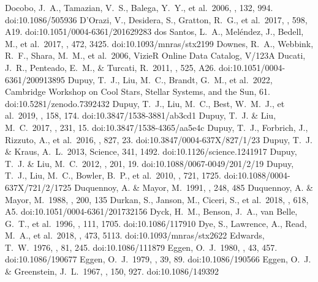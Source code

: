 \documentclass[twocolumn,tighten,twocolappendix]{aastex631}
\begin{document}
\begin{thebibliography}{}
 Docobo, J.~A., Tamazian, V.~S., Balega, Y.~Y., et al.\ 2006, \aj, 132, 994. doi:10.1086/505936
 D'Orazi, V., Desidera, S., Gratton, R.~G., et al.\ 2017, \aap, 598, A19. doi:10.1051/0004-6361/201629283
 dos Santos, L.~A., Mel{\'e}ndez, J., Bedell, M., et al.\ 2017, \mnras, 472, 3425. doi:10.1093/mnras/stx2199
 Downes, R.~A., Webbink, R.~F., Shara, M.~M., et al.\ 2006, VizieR Online Data Catalog, V/123A
 Ducati, J.~R., Penteado, E.~M., \& Turcati, R.\ 2011, \aap, 525, A26. doi:10.1051/0004-6361/200913895
 Dupuy, T.~J., Liu, M.~C., Brandt, G.~M., et al.\ 2022, Cambridge Workshop on Cool Stars, Stellar Systems, and the Sun, 61. doi:10.5281/zenodo.7392432
 Dupuy, T.~J., Liu, M.~C., Best, W.~M.~J., et al.\ 2019, \aj, 158, 174. doi:10.3847/1538-3881/ab3cd1
 Dupuy, T.~J. \& Liu, M.~C.\ 2017, \apjs, 231, 15. doi:10.3847/1538-4365/aa5e4c
 Dupuy, T.~J., Forbrich, J., Rizzuto, A., et al.\ 2016, \apj, 827, 23. doi:10.3847/0004-637X/827/1/23
 Dupuy, T.~J. \& Kraus, A.~L.\ 2013, Science, 341, 1492. doi:10.1126/science.1241917
 Dupuy, T.~J. \& Liu, M.~C.\ 2012, \apjs, 201, 19. doi:10.1088/0067-0049/201/2/19
 Dupuy, T.~J., Liu, M.~C., Bowler, B.~P., et al.\ 2010, \apj, 721, 1725. doi:10.1088/0004-637X/721/2/1725
 Duquennoy, A. \& Mayor, M.\ 1991, \aap, 248, 485
 Duquennoy, A. \& Mayor, M.\ 1988, \aap, 200, 135
 Durkan, S., Janson, M., Ciceri, S., et al.\ 2018, \aap, 618, A5. doi:10.1051/0004-6361/201732156
 Dyck, H.~M., Benson, J.~A., van Belle, G.~T., et al.\ 1996, \aj, 111, 1705. doi:10.1086/117910
 Dye, S., Lawrence, A., Read, M.~A., et al.\ 2018, \mnras, 473, 5113. doi:10.1093/mnras/stx2622
 Edwards, T.~W.\ 1976, \aj, 81, 245. doi:10.1086/111879
 Eggen, O.~J.\ 1980, \apjs, 43, 457. doi:10.1086/190677
 Eggen, O.~J.\ 1979, \apjs, 39, 89. doi:10.1086/190566
 Eggen, O.~J. \& Greenstein, J.~L.\ 1967, \apj, 150, 927. doi:10.1086/149392

\end{thebibliography}
\end{document}
